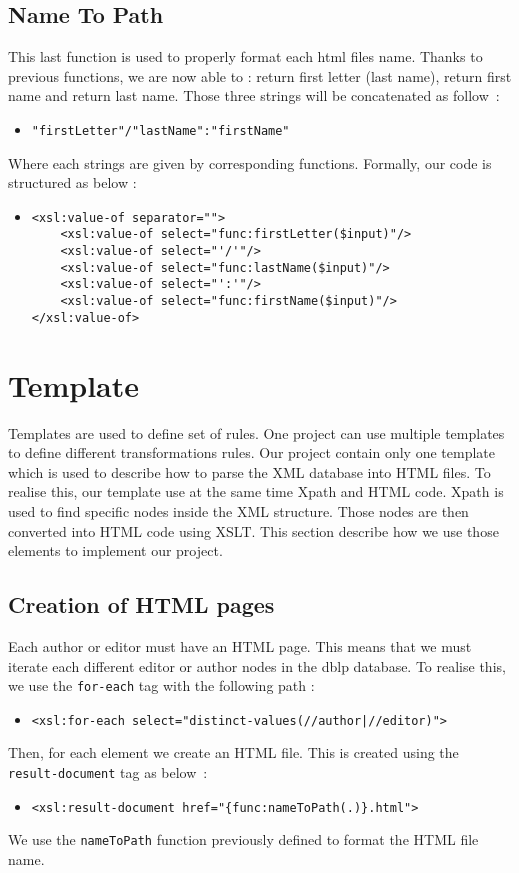 \documentclass{article}
\begin{document}
\subsection{Name To Path} 
This last function is used to properly format each html files name. Thanks to previous functions, we are now able to :  return first letter (last name), return first name and return last name. Those three strings will be concatenated as follow~: 
\begin{itemize}
\item \verb|"firstLetter"/"lastName":"firstName"|
\end{itemize}
Where each strings are given by corresponding functions. Formally, our code is structured as below : 
\begin{itemize}
\item \begin{verbatim}
<xsl:value-of separator="">
    <xsl:value-of select="func:firstLetter($input)"/>
    <xsl:value-of select="'/'"/>
    <xsl:value-of select="func:lastName($input)"/>
    <xsl:value-of select="':'"/>
    <xsl:value-of select="func:firstName($input)"/>
</xsl:value-of>
\end{verbatim}
\end{itemize}

\section{Template}
Templates are used to define set of rules. One project can use multiple templates to define different transformations rules. Our project contain only one template which is used to describe how to parse the XML database into HTML files. To realise this, our template use at the same time Xpath and HTML code. Xpath is used to find specific nodes inside the XML structure. Those nodes are then converted into HTML code using XSLT. This section describe how we use those elements to implement our project.

\subsection{Creation of HTML pages} 
Each author or editor must have an HTML page. This means that we must iterate each different editor or author nodes in the dblp database. To realise this, we use the \verb|for-each| tag with the following path : 
\begin{itemize}
\item \begin{verbatim}
<xsl:for-each select="distinct-values(//author|//editor)">
\end{verbatim}
\end{itemize}
Then, for each element we create an HTML file. This is created using the \verb|result-document| tag as below~:
\begin{itemize}
\item \begin{verbatim}<xsl:result-document href="{func:nameToPath(.)}.html">\end{verbatim}
\end{itemize}
We use the \verb|nameToPath| function previously defined to format the HTML file name.
\end{document}
